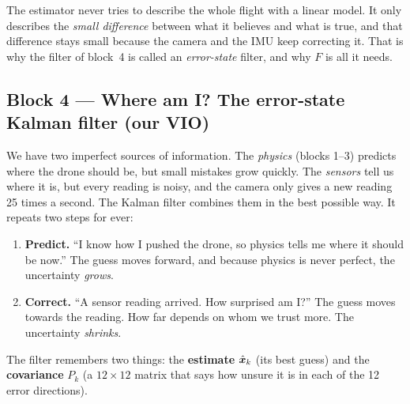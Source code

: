 \begin{real}
The estimator never tries to describe the whole flight with a linear model. It only describes the \emph{small
difference} between what it believes and what is true, and that difference stays small because the camera and the
IMU keep correcting it. That is why the filter of block~4 is called an \emph{error-state} filter, and why $F$ is all
it needs.
\end{real}

\subsection{Block 4 --- Where am I? The error-state Kalman filter (our VIO)}
\label{sec:m1b4}

\begin{idea}
We have two imperfect sources of information. The \emph{physics} (blocks 1--3) predicts where the drone should be,
but small mistakes grow quickly. The \emph{sensors} tell us where it is, but every reading is noisy, and the camera
only gives a new reading 25 times a second. The Kalman filter combines them in the best possible way. It repeats
two steps for ever:
\begin{enumerate}
  \item \textbf{Predict.} ``I know how I pushed the drone, so physics tells me where it should be now.'' The guess
        moves forward, and because physics is never perfect, the uncertainty \emph{grows}.
  \item \textbf{Correct.} ``A sensor reading arrived. How surprised am I?'' The guess moves towards the reading. How
        far depends on whom we trust more. The uncertainty \emph{shrinks}.
\end{enumerate}
The filter remembers two things: the \textbf{estimate} $\hat{\bm x}_k$ (its best guess) and the \textbf{covariance} $P_k$
(a $12\times12$ matrix that says how unsure it is in each of the 12 error directions).
\end{idea}

